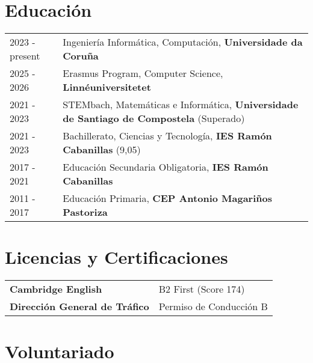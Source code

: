 \documentclass[a4paper,12pt]{article}
\begin{document}
\section{Educación}
\begin{tabularx}{\linewidth}{@{}l X@{}}
2023 - present & Ingeniería Informática, Computación,  \textbf{Universidade da Coruña} \hfill \normalsize \\

2025 - 2026 & Erasmus Program, Computer Science, \textbf{Linnéuniversitetet} \\

2021 - 2023 & STEMbach, Matemáticas e Informática, \textbf{Universidade de Santiago de Compostela} \hfill  (Superado) \\

2021 - 2023 & Bachillerato, Ciencias y Tecnología, \textbf{IES Ramón Cabanillas} \hfill  (9,05) \\

2017 - 2021 & Educación Secundaria Obligatoria, \textbf{IES Ramón Cabanillas} \\

2011 - 2017 & Educación Primaria, \textbf{CEP Antonio Magariños Pastoriza} \\
\end{tabularx}


\section{Licencias y Certificaciones}

\begin{tabularx}{\linewidth}{@{}l X@{}}
\textbf{Cambridge English} & B2 First \hfill \normalsize (Score 174)\\

\textbf{Dirección General de Tráfico} & Permiso de Conducción B \\

\end{tabularx}


\section{Voluntariado}
\end{document}
